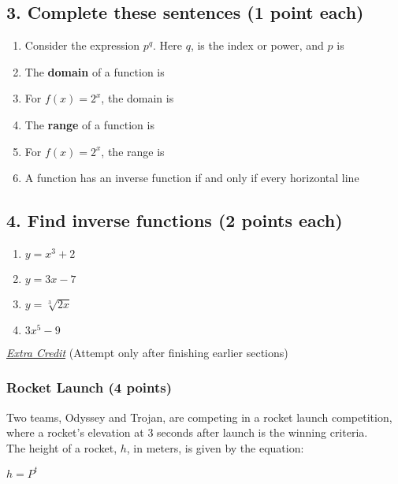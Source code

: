 \documentclass{hw}
\begin{document}
\subsection*{3. Complete these sentences (1 point each)}
\begin{enumerate}[label=\alph*.]
    \item Consider the expression $p^q$. Here $q$, is the index or power, and $p$ is \dottedline
    \item The \textbf{domain} of a function is \dottedline \dottedline
    \item For $f(x) = 2^x$, the domain is \dottedline \dottedline
    \item The \textbf{range} of a function is \dottedline \dottedline
    \item For $f(x) = 2^x$, the range is \dottedline \dottedline
    \item A function has an inverse function if and only if every horizontal line \dottedline \dottedline
\end{enumerate}

\newpage
\subsection*{4. Find inverse functions (2 points each)}
\begin{enumerate}[label=\alph*.]
    \item $y = x^3 + 2$
    \studentxxlargeworkspace
    \item $y = 3x - 7$
    \studentxxlargeworkspace
    \newpage
    \item $y = \sqrt[3]{2x}$
    \studentxxlargeworkspace
    \item $3x^5 - 9$
    \studentxxlargeworkspace
\end{enumerate}

\newpage
\uline{\textit{Extra Credit}}
(Attempt only after finishing earlier sections)

\subsubsection*{Rocket Launch (4 points)}

Two teams, Odyssey and Trojan, are competing in a rocket launch competition, where a rocket's elevation at 3 seconds after launch is the winning criteria.\\

The height of a rocket, $h$, in meters, is given by the equation:

{\centering
$ h = P^t $
\par}
\end{document}
